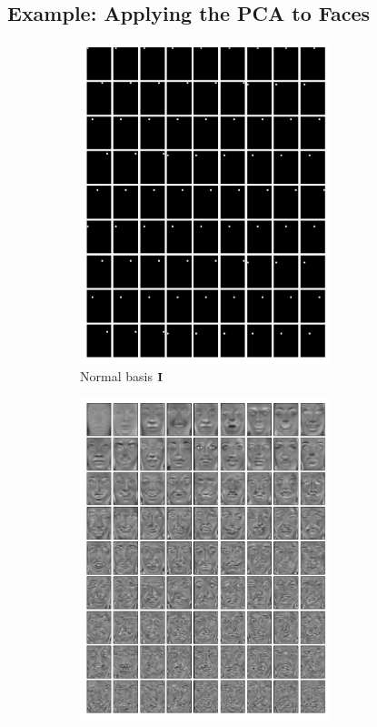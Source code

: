 \documentclass[10pt,letterpaper,oneside]{article}
\begin{document}
\subsection{Example: Applying the PCA to Faces}

\begin{figure}[p]
	\begin{subfigure}{0.5\textwidth}
		\centering
		\includegraphics[width=0.8\textwidth]{media/eigenfaces_normal_basis.pdf}
		\caption{Normal basis ${\mathbf{I}}$}
		\label{fig:eigenfaces_normal_basis}
	\end{subfigure}
	\begin{subfigure}{0.5\textwidth}
		\centering
		\includegraphics[width=0.8\textwidth]{media/eigenfaces.pdf}

\end{subfigure}
\end{figure}
\end{document}
